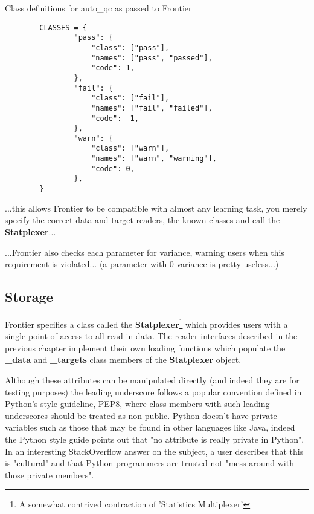 \begin{listing}[H]
    \caption[FrontierClasses]{Class definitions for auto\_qc as passed to Frontier}
    \label{fig:FrontierClasses}
    \begin{verbatim}
        CLASSES = {
                "pass": {
                    "class": ["pass"],
                    "names": ["pass", "passed"],
                    "code": 1,
                },
                "fail": {
                    "class": ["fail"],
                    "names": ["fail", "failed"],
                    "code": -1,
                },
                "warn": {
                    "class": ["warn"],
                    "names": ["warn", "warning"],
                    "code": 0,
                },
        }
    \end{verbatim}
\end{listing}

...this allows Frontier to be compatible with almost any learning task, you
merely specify the correct data and target readers, the known classes and call
the \textbf{Statplexer}...

...Frontier also checks each parameter for variance, warning users when this
requirement is violated... (a parameter with 0 variance is pretty useless...)

\subsection{Storage}

Frontier specifies a class called the \textbf{Statplexer}\footnote{A somewhat
contrived contraction of 'Statistics Multiplexer'} which provides users with a
single point of access to all read in data. The reader interfaces described in
the previous chapter implement their own loading functions which populate the
\textbf{\_data} and \textbf{\_targets} class members of the \textbf{Statplexer}
object.

Although these attributes can be manipulated directly (and indeed they are for
testing purposes) the leading underscore follows a popular convention defined in
Python's style guideline, PEP8\citep{pep8}, where class members with such
leading underscores should be treated as non-public. Python doesn't have private
variables such as those that may be found in other languages like Java, indeed
the Python style guide points out that "no attribute is really private in
Python"\citep{pep8}. In an interesting StackOverflow answer on the subject, a
user describes that this is "cultural"\citep{so:pythonprivate} and that Python
programmers are trusted not "mess around with those private members".

